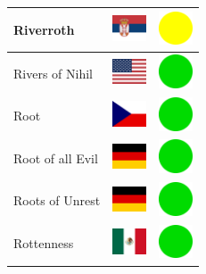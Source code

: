 \documentclass[12pt, a4paper, twoside]{report}
\begin{document}
\begin{center}
\begin{longtable}{|p{5cm}|p{2cm}|p{2cm}|}
 Riverroth                                                  & \includegraphics[width=1cm]{../4x3/rs} &   \includegraphics[width=1cm]{../likes/m} \\ \hline
 Rivers of Nihil                                            & \includegraphics[width=1cm]{../4x3/us} &   \includegraphics[width=1cm]{../likes/y} \\ \hline
 Root                                                       & \includegraphics[width=1cm]{../4x3/cz} &   \includegraphics[width=1cm]{../likes/y} \\ \hline
 Root of all Evil                                           & \includegraphics[width=1cm]{../4x3/de} &   \includegraphics[width=1cm]{../likes/y} \\ \hline
 Roots of Unrest                                            & \includegraphics[width=1cm]{../4x3/de} &   \includegraphics[width=1cm]{../likes/y} \\ \hline
 Rottenness                                                 & \includegraphics[width=1cm]{../4x3/mx} &   \includegraphics[width=1cm]{../likes/y} \\ \hline

\end{longtable}
\end{center}
\end{document}
